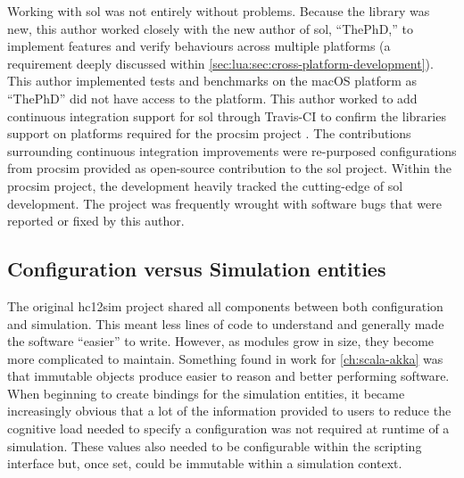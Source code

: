 Working with sol was not entirely without problems. Because the library was new, this author worked closely with the new author of sol, ``ThePhD,'' to implement features and verify behaviours across multiple platforms (a requirement deeply discussed within \cref{sec:lua:sec:cross-platform-development}). This author implemented tests and benchmarks on the macOS platform as ``ThePhD'' did not have access to the platform. This author worked to add continuous integration support for sol through Travis-CI \cite{TravisCI} to confirm the libraries support on platforms required for the procsim project \cite{Github:ThePhD:sol2:pr:17, Github:ThePhD:sol2:pr:18}. The contributions surrounding continuous integration improvements were re-purposed configurations from procsim provided as open-source contribution to the sol project. Within the procsim project, the development heavily tracked the cutting-edge of sol development. The project was frequently wrought with software bugs that were reported or fixed by this author. 

\subsection{Configuration versus Simulation entities}

The original hc12sim project shared all components between both configuration and simulation. This meant less lines of code to understand and generally made the software ``easier'' to write. However, as modules grow in size, they become more complicated to maintain. Something found in work for \cref{ch:scala-akka} was that immutable objects produce easier to reason and better performing software. When beginning to create bindings for the simulation entities, it became increasingly obvious that a lot of the information provided to users to reduce the cognitive load needed to specify a configuration was not required at runtime of a simulation. These values also needed to be configurable within the scripting interface but, once set, could be immutable within a simulation context.

